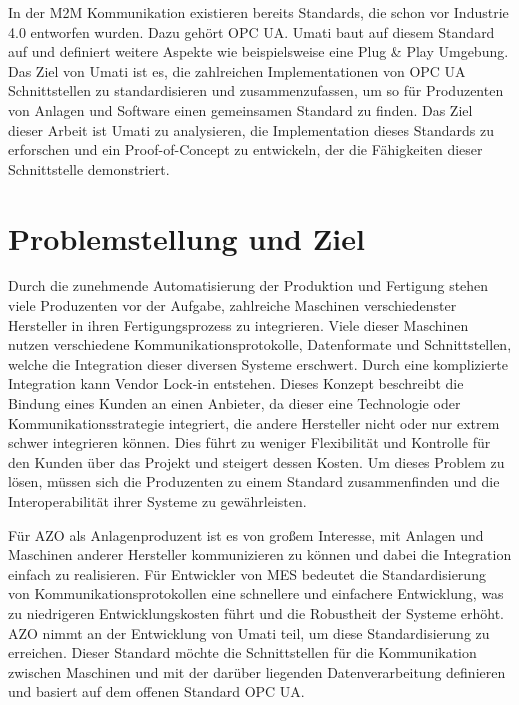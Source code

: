 \documentclass[a4paper, 12pt, oneside, toc=listofnumbered, bibliography=totoc]{scrbook}
\begin{document}
	In der M2M Kommunikation existieren bereits Standards, die schon vor Industrie 4.0 entworfen wurden. Dazu gehört \ac{OPC UA}. \ac{Umati} baut auf diesem Standard auf und definiert weitere Aspekte wie beispielsweise eine Plug \& Play Umgebung. Das Ziel von \ac{Umati} ist es, die zahlreichen Implementationen von OPC UA Schnittstellen zu standardisieren und zusammenzufassen, um so für Produzenten von Anlagen und Software einen gemeinsamen Standard zu finden. Das Ziel dieser Arbeit ist \ac{Umati} zu analysieren, die Implementation dieses Standards zu erforschen und ein Proof-of-Concept zu entwickeln, der die Fähigkeiten dieser Schnittstelle demonstriert.
	
	\section{Problemstellung und Ziel}
	
	
	 Durch die zunehmende Automatisierung der Produktion und Fertigung stehen viele Produzenten vor der Aufgabe, zahlreiche Maschinen verschiedenster Hersteller in ihren Fertigungsprozess zu integrieren. Viele dieser Maschinen nutzen verschiedene Kommunikationsprotokolle, Datenformate und Schnittstellen, welche die Integration dieser diversen Systeme erschwert. Durch eine komplizierte Integration kann Vendor Lock-in entstehen. Dieses Konzept beschreibt die Bindung eines Kunden an einen Anbieter, da dieser eine Technologie oder Kommunikationsstrategie integriert, die andere Hersteller nicht oder nur extrem schwer integrieren können. Dies führt zu weniger Flexibilität und Kontrolle für den Kunden über das Projekt und steigert dessen Kosten. Um dieses Problem zu lösen, müssen sich die Produzenten zu einem Standard zusammenfinden und die Interoperabilität ihrer Systeme zu gewährleisten. \cite{mielebacher_verteilte_2021}
	 
	 Für AZO als Anlagenproduzent ist es von großem Interesse, mit Anlagen und Maschinen anderer Hersteller kommunizieren zu können und dabei die Integration einfach zu realisieren. Für Entwickler von \ac{MES} bedeutet die Standardisierung von Kommunikationsprotokollen eine schnellere und einfachere Entwicklung, was zu niedrigeren Entwicklungskosten führt und die Robustheit der Systeme erhöht. AZO nimmt an der Entwicklung von \ac{Umati} teil, um diese Standardisierung zu erreichen. Dieser Standard möchte die Schnittstellen für die Kommunikation zwischen Maschinen und mit der darüber liegenden Datenverarbeitung definieren und basiert auf dem offenen Standard \ac{OPC UA}.
	 
\end{document}
